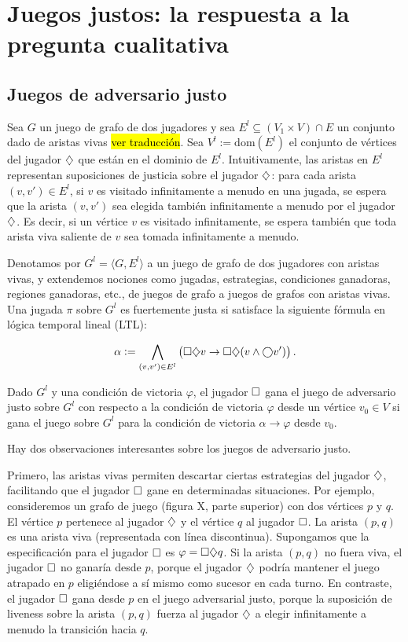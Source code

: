 \section{Juegos justos: la respuesta a la pregunta cualitativa}

\subsection{Juegos de adversario justo}

Sea $G$ un juego de grafo de dos jugadores y sea $E^{l} \subseteq (V_1 \times
	V) \cap E$ un conjunto dado de aristas vivas \hl{ver traducción}. Sea $V^{l} :=
	\mathrm{dom}(E^{l})$ el conjunto de vértices del jugador $\diamondsuit$ que están en
el dominio de $E^{l}$. Intuitivamente, las aristas en $E^{l}$ representan
suposiciones de justicia sobre el jugador $\diamondsuit$: para cada arista $(v, v')
	\in E^{l}$, si $v$ es visitado infinitamente a menudo en una jugada, se espera
que la arista $(v, v')$ sea elegida también infinitamente a menudo por el
jugador $\diamondsuit$. Es decir, si un vértice $v$ es visitado infinitamente, se
espera también que toda arista viva saliente de $v$ sea tomada infinitamente a
menudo.

Denotamos por $G^{l} = \langle G, E^{l} \rangle$ a un juego de grafo de dos
jugadores con aristas vivas, y extendemos nociones como jugadas, estrategias,
condiciones ganadoras, regiones ganadoras, etc., de juegos de grafo a juegos de
grafos con aristas vivas. Una jugada $\pi$ sobre $G^{l}$ es fuertemente justa
si satisface la siguiente fórmula en lógica temporal lineal (LTL):

\[
	\alpha := \bigwedge_{(v, v') \in E^{l}} \left( \square \diamondsuit v \rightarrow \square \diamondsuit (v \wedge \bigcirc v') \right).
\]

Dado $G^{l}$ y una condición de victoria $\varphi$, el jugador $\square$ gana el
juego de adversario justo sobre $G^{l}$ con respecto a la condición de victoria
$\varphi$ desde un vértice $v_0 \in V$ si gana el juego sobre $G^{l}$ para la
condición de victoria $\alpha \rightarrow \varphi$ desde $v_0$.

Hay dos observaciones interesantes sobre los juegos de adversario justo.

Primero, las aristas vivas permiten descartar ciertas estrategias del jugador
$\diamondsuit$, facilitando que el jugador $\square$ gane en determinadas situaciones.
Por ejemplo, consideremos un grafo de juego (figura X, parte superior) con dos
vértices $p$ y $q$. El vértice $p$ pertenece al jugador $\diamondsuit$ y el vértice
$q$ al jugador $\square$. La arista $(p, q)$ es una arista viva (representada con
línea discontinua). Supongamos que la especificación para el jugador $\square$ es
$\varphi = \square \diamondsuit q$. Si la arista $(p, q)$ no fuera viva, el jugador
$\square$ no ganaría desde $p$, porque el jugador $\diamondsuit$ podría mantener el
juego atrapado en $p$ eligiéndose a sí mismo como sucesor en cada turno. En
contraste, el jugador $\square$ gana desde $p$ en el juego adversarial justo,
porque la suposición de liveness sobre la arista $(p, q)$ fuerza al jugador
$\diamondsuit$ a elegir infinitamente a menudo la transición hacia $q$.


